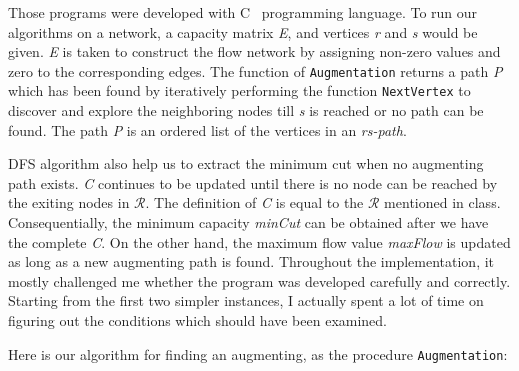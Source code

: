 \documentclass[11pt]{article}
\begin{document}
Those programs were developed with C~\cite{C} programming language. To run our algorithms on a network, a capacity matrix \emph{E}, and vertices \emph{r} and \emph{s} would be given. \emph{E} is taken to construct the flow network by assigning non-zero values and zero to the corresponding edges. The function of \texttt{Augmentation} returns a path \emph{P} which has been found by iteratively performing the function \texttt{NextVertex} to discover and explore the neighboring nodes till \emph{s} is reached or no path can be found. The path \emph{P} is an ordered list of the vertices in an \emph{rs-path}.%

DFS algorithm also help us to extract the minimum cut when no augmenting path exists. \emph{C} continues to be updated until there is no node can be reached by the exiting nodes in $\mathcal{R}$. The definition of \emph{C} is equal to the $\mathcal{R}$ mentioned in class. Consequentially, the minimum capacity \emph{minCut} can be obtained after we have the complete \emph{C}. On the other hand, the maximum flow value \emph{maxFlow} is updated as long as a new augmenting path is found. Throughout the implementation, it mostly challenged me whether the program was developed carefully and correctly. Starting from the first two simpler instances, I actually spent a lot of time on figuring out the conditions which should have been examined.

Here is our algorithm for finding an augmenting, as the procedure \texttt{Augmentation}:
\end{document}
